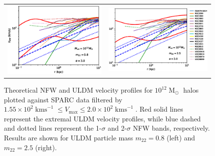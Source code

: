 \documentclass[a4paper,11pt]{article}
\begin{document}
\begin{figure}
\begin{tabular}{cc}
{\includegraphics[scale = 0.65, trim={2.5cm 2.5cm 2.1cm 0.1cm}]{pics/v_12_8_3_paper.eps}} &
{\includegraphics[scale = 0.65, trim={2.1cm 2.5cm 0cm 0.1cm}]{pics/v_12_25_3_paper.eps}}
\end{tabular}
\caption{Theoretical NFW and ULDM velocity profiles for $10^{12}\operatorname{M}_{\odot}$ halos plotted against SPARC data filtered by $1.55\times 10^2 \operatorname{kms}^{-1}\leq V_{\mathrm{max}}\leq 2.0\times 10^2 \operatorname{kms}^{-1}$. Red solid lines represent the extremal ULDM velocity profiles, while  blue dashed and dotted lines represent the 1-$\sigma$ and 2-$\sigma$ NFW bands, respectively. Results are shown for ULDM particle mass $m_{22} = 0.8$ (left) and $m_{22} = 2.5 $ (right). }\label{fig:velocity_12}
\end{figure}
\end{document}
